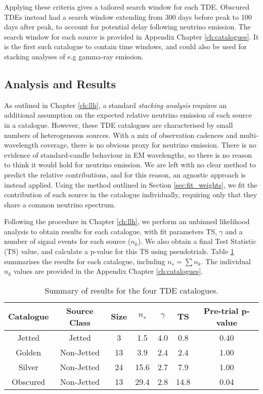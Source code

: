 Applying these criteria gives a tailored search window for each TDE. Obscured TDEs instead had a search window extending from 300 days before peak to 100 days after peak, to account for potential delay following neutrino emission. The search window for each source is provided in Appendix Chapter \ref{ch:catalogues}. It is the first such catalogue to contain time windows, and could also be used for stacking analyses of e.g gamma-ray emission.

\subsection*{Analysis and Results}

As outlined in Chapter \ref{ch:llh}, a standard \emph{stacking analysis} requires an additional assumption on the expected relative neutrino emission of each source in a catalogue. However, these TDE catalogues are characterised by small numbers of heterogeneous sources. With a mix of observation cadences and multi-wavelength coverage, there is no obvious proxy for neutrino emission. There is no evidence of standard-candle behaviour in EM wavelengths, so there is no reason to think it would hold for neutrino emission. We are left with no clear method to predict the relative contributions, and for this reason, an agnostic approach is instead applied. Using the method outlined in Section \ref{sec:fit_weights}, we fit the contribution of each source in the catalogue individually, requiring only that they share a common neutrino spectrum.

Following the procedure in Chapter \ref{ch:llh}, we perform an unbinned likelihood analysis to obtain results for each catalogue, with fit parameters TS, $\gamma$ and a number of signal events for each source ($n_{k}$). We also obtain a final Test Statistic (TS) value, and calculate a p-value for this TS using pseudotrials. Table \ref{tab:stacking_tests} summarises the results for each catalogue, including $n_{s} = \sum n_{k}$. The individual $n_{k}$ values are provided in the Appendix Chapter \ref{ch:catalogues}.

\begin{table}[]
	\centering
	\begin{tabular}{||c c c| c c c | c||} 
		\hline
		Catalogue & Source Class & Size & $n_{s}$  & $\gamma$ & TS & Pre-trial p-value\\
		\hline\hline
		Jetted & Jetted &  3 & 1.5& 4.0&0.8&0.40\\ 
		\hline
		Golden & Non-Jetted & 13 &3.9&2.4& 2.4&1.00\\
		\hline
		Silver & Non-Jetted & 24 &15.6&2.7&7.9 & 1.00\\
		\hline
		Obscured & Non-Jetted & 13 &29.4&2.8&14.8& 0.04\\[1ex] 
		\hline
	\end{tabular}
	\caption{Summary of results for the four TDE catalogues.}
	\label{tab:stacking_tests}
\end{table}{}

